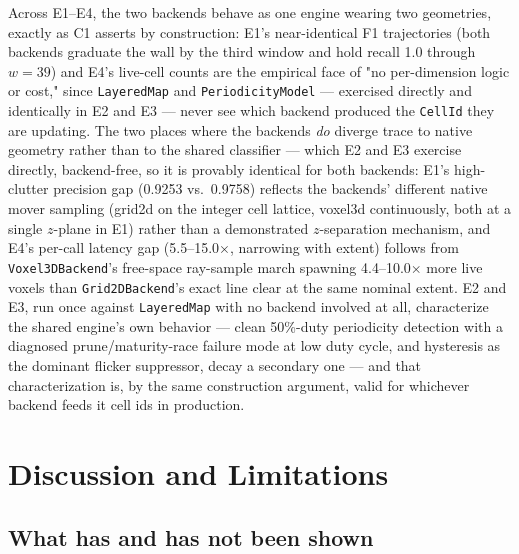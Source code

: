 \documentclass[conference]{IEEEtran}
\begin{document}
Across E1--E4, the two backends behave as one engine wearing two geometries,
exactly as C1 asserts by construction: E1's near-identical F1 trajectories
(both backends graduate the wall by the third window and hold recall 1.0
through $w{=}39$) and E4's live-cell counts are the
empirical face of "no per-dimension logic or cost," since \texttt{LayeredMap} and
\texttt{PeriodicityModel} --- exercised directly and identically in E2 and E3 --- never
see which backend produced the \texttt{CellId} they are updating. The two places
where the backends \emph{do} diverge trace to native geometry rather than to the
shared classifier --- which E2 and E3 exercise directly, backend-free, so it is
provably identical for both backends:
E1's high-clutter precision gap (0.9253 vs.\ 0.9758) reflects the backends'
different native mover sampling (grid2d on the integer cell lattice, voxel3d
continuously, both at a single $z$-plane in E1) rather than a demonstrated
$z$-separation mechanism, and E4's per-call latency gap
(5.5--15.0$\times$, narrowing with extent) follows from \texttt{Voxel3DBackend}'s
free-space ray-sample march spawning 4.4--10.0$\times$ more live voxels than
\texttt{Grid2DBackend}'s exact line clear at the same nominal extent. E2 and E3,
run once against \texttt{LayeredMap} with no backend involved at all, characterize
the shared engine's own behavior --- clean 50\%-duty periodicity detection with
a diagnosed prune/maturity-race failure mode at low duty cycle, and
hysteresis as the dominant flicker suppressor, decay a secondary one --- and
that characterization is, by the same construction argument, valid for
whichever backend feeds it cell ids in production.

\section{Discussion and Limitations}
\label{sec:discussion}

\subsection{What has and has not been shown}
\end{document}
